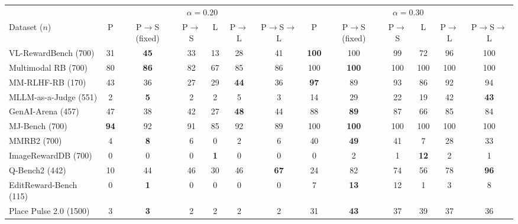 \begin{tabular}{l|cccccc|cccccc}
\toprule
 & \multicolumn{6}{c}{$\alpha=0.20$} & \multicolumn{6}{c}{$\alpha=0.30$}\\
Dataset ($n$) & P & P$\to$S (fixed) & P$\to$S & L & P$\to$L & P$\to$S$\to$L & P & P$\to$S (fixed) & P$\to$S & L & P$\to$L & P$\to$S$\to$L\\
\midrule
VL-RewardBench (700) & 31 & \textbf{45} & 33 & 13 & 28 & 41 & \textbf{100} & 100 & 99 & 72 & 96 & 100\\
Multimodal RB (700) & 80 & \textbf{86} & 82 & 67 & 85 & 86 & 100 & \textbf{100} & 100 & 100 & 100 & 100\\
MM-RLHF-RB (170) & 43 & 36 & 27 & 29 & \textbf{44} & 36 & \textbf{97} & 89 & 93 & 86 & 92 & 94\\
MLLM-as-a-Judge (551) & 2 & \textbf{5} & 2 & 2 & 5 & 3 & 14 & 29 & 22 & 19 & 42 & \textbf{43}\\
GenAI-Arena (457) & 47 & 38 & 42 & 27 & \textbf{48} & 44 & 88 & \textbf{89} & 87 & 66 & 85 & 84\\
MJ-Bench (700) & \textbf{94} & 92 & 91 & 85 & 92 & 89 & 100 & \textbf{100} & 100 & 100 & 100 & 100\\
MMRB2 (700) & 4 & \textbf{8} & 6 & 0 & 2 & 6 & 40 & \textbf{49} & 41 & 7 & 28 & 33\\
ImageRewardDB (700) & 0 & 0 & 0 & \textbf{1} & 0 & 0 & 0 & 2 & 1 & \textbf{12} & 2 & 1\\
Q-Bench2 (442) & 10 & 44 & 46 & 30 & 46 & \textbf{67} & 24 & 82 & 74 & 56 & 78 & \textbf{96}\\
EditReward-Bench (115) & 0 & \textbf{1} & 0 & 0 & 0 & 0 & 7 & \textbf{13} & 12 & 1 & 3 & 8\\
Place Pulse 2.0 (1500) & 3 & \textbf{3} & 2 & 2 & 2 & 2 & 31 & \textbf{43} & 37 & 39 & 37 & 36\\
\bottomrule
\end{tabular}
